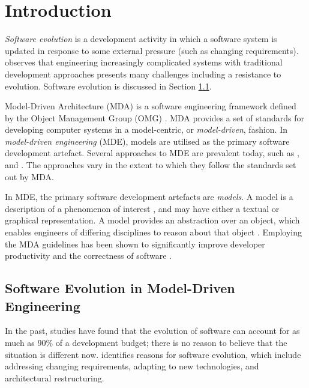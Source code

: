 

\section{Introduction}
\label{sec:introduction}

\textit{Software evolution} is a development activity in which a software system is updated in response to some external pressure (such as changing requirements). \cite{brooks86nosilverbullet} observes that engineering increasingly complicated systems with traditional development approaches presents many challenges including a resistance to evolution. Software evolution is discussed in Section \ref{sub:software_evo}.

Model-Driven Architecture (MDA) is a software engineering framework defined by the Object Management
Group (OMG) \cite{omg}. MDA provides a set of standards for developing computer systems in a model-centric, or \textit{model-driven}, fashion. In \textit{model-driven engineering} (MDE), models are utilised as the primary software development artefact. Several approaches to MDE are prevalent today, such as \cite{stahl06mdsd}, \cite{kelly08dsm} and \cite{greenfield04software}. The approaches vary in the extent to which they follow the standards set out by MDA.

In MDE, the primary software development artefacts are \textit{models}. A model is a description of a phenomenon of interest \cite{jackson96software}, and may have either a textual or graphical representation. A model provides an abstraction over an object, which enables engineers of differing disciplines to reason about that object \cite{kolovos06eol}. Employing the MDA guidelines has been shown to significantly improve developer productivity and the correctness of software \cite{watson08mdahistory}.

\subsection{Software Evolution in Model-Driven Engineering}
\label{sub:software_evo}
In the past, studies \cite{erlikh00leveraging,moad90maintaining} have found that the evolution of software can account for as much as 90\% of a development budget; there is no reason to believe that the situation is different now. \cite{sjoberg93quantifying} identifies reasons for software evolution, which include addressing changing requirements, adapting to new technologies, and architectural restructuring.

